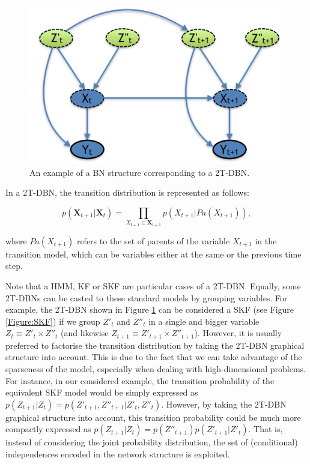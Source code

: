 \begin{figure}[ht!]
\begin{center}
\includegraphics[scale=0.3]{./figures/PreliminariesDBN}
\caption{\label{Figure:DBN}An example of a BN structure corresponding to a 2T-DBN.}
\end{center}
\end{figure}

In a 2T-DBN, the transition distribution is represented as follows:

$$ p(\bm X_{t+1} | \bm X_t) = \prod_{X_{t+1}\in\bm X_{t+1}} p(X_{t+1}|Pa(X_{t+1})),$$ 

\noindent where $Pa(X_{t+1})$ refers to the set of parents of the variable $X_{t+1}$ in the transition model, which can be variables either at the same or the previous time step. 

Note that a HMM, KF or SKF are particular cases of a 2T-DBN. Equally, some 2T-DBNs can be casted to these standard models by grouping variables. For example, the 2T-DBN shown in Figure \ref{Figure:DBN} can be considered a SKF (see Figure \ref{Figure:SKF}) if we group $Z'_t$ and $Z''_t$ in a single and bigger variable $Z_t \equiv Z'_t \times Z''_t $ (and likewise $Z_{t+1} \equiv Z'_{t+1} \times Z''_{t+1} $). However, it is usually preferred to factorise the transition distribution by taking the 2T-DBN graphical structure into account. This is due to the fact that we can take advantage of the sparseness of the model, especially when dealing with high-dimensional problems. For instance, in our considered example, the transition probability of the equivalent SKF model would be simply expressed as $p(Z_{t+1}|Z_t) = p(Z'_{t+1},Z''_{t+1}|Z'_t,Z''_t) $. However, by taking the 2T-DBN graphical structure into account, this transition probability could be much more compactly expressed as $p(Z_{t+1}|Z_t)=p(Z''_{t+1})p(Z'_{t+1}|Z'_t)$. That is, instead of considering the joint probability distribution, the set of (conditional) independences encoded in the network structure is exploited.

